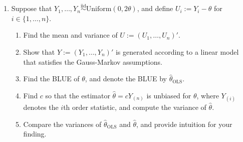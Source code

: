 \documentclass[11pt]{article}
\begin{document}
\begin{enumerate}
\item Suppose that $Y_{1},\dots,Y_{n} \overset{\text{iid}}{\sim} \text{Uniform}(0,2\theta)$, and define $U_{i} := Y_{i} - \theta$ for $i \in \{1,\dots,n\}$.
\begin{enumerate}
\item Find the mean and variance of $U := (U_{1},\dots,U_{n})'$.
\item Show that $Y := (Y_{1},\dots,Y_{n})'$ is generated according to a linear model that satisfies the Gauss-Markov assumptions.
\item Find the BLUE of $\theta$, and denote the BLUE by $\hat{\theta}_{\text{OLS}}$.
\item Find $c$ so that the estimator $\hat{\theta} = cY_{(n)}$ is unbiased for $\theta$, where $Y_{(i)}$ denotes the $i$th order statistic, and compute the variance of $\hat{\theta}$.
\item Compare the variances of $\hat{\theta}_{\text{OLS}}$ and $\hat{\theta}$, and provide intuition for your finding.
\end{enumerate}







\end{enumerate}
\end{document}
